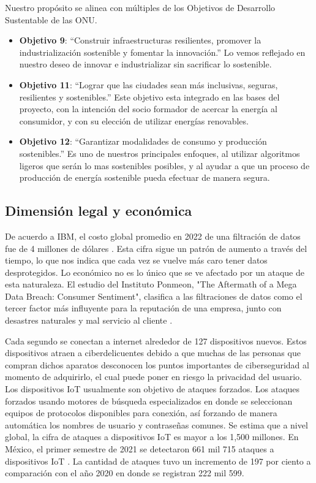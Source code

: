 \documentclass{article}
\begin{document}
            Nuestro propósito se alinea con múltiples de los Objetivos de Desarrollo Sustentable de las ONU.
            \begin{itemize}[noitemsep, leftmargin=*]
                \item \textbf{Objetivo 9}: \enquote{Construir infraestructuras resilientes, promover la industrialización sostenible y fomentar la innovación.}  \cite{obj9} Lo vemos reflejado en nuestro deseo de innovar e industrializar sin sacrificar lo sostenible.
                \item \textbf{Objetivo 11}: \enquote{Lograr que las ciudades sean más inclusivas, seguras, resilientes y sostenibles.} \cite{obj11} Este objetivo esta integrado en las bases del proyecto, con la intención del socio formador de acercar la energía al consumidor, y con su elección de utilizar energías renovables.
                \item \textbf{Objetivo 12}: \enquote{Garantizar modalidades de consumo y producción sostenibles.}\cite{obj12} Es uno de nuestros principales enfoques, al utilizar algoritmos ligeros que serán lo mas sostenibles posibles, y al ayudar a que un proceso de producción de energía sostenible pueda efectuar de manera segura.
            \end{itemize}

        \subsection{Dimensión legal y económica}

            De acuerdo a IBM, el costo global promedio en 2022 de una filtración de datos fue de 4 millones de dólares \cite{cost_DB}. Esta cifra sigue un patrón de aumento a través del tiempo, lo que nos indica que cada vez se vuelve más caro tener datos desprotegidos. Lo económico no es lo único que se ve afectado por un ataque de esta naturaleza. El estudio del Instituto Ponmeon, "The Aftermath of a Mega Data Breach: Consumer Sentiment", clasifica a las filtraciones de datos como el tercer factor más influyente para la reputación de una empresa, junto con desastres naturales y mal servicio al cliente \cite{ponmeon}.

            Cada segundo se conectan a internet alrededor de 127 dispositivos nuevos. Estos dispositivos atraen a ciberdelicuentes debido a que muchas de las personas que compran dichos aparatos desconocen los puntos importantes de ciberseguridad al momento de adquirirlo, el cual puede poner en riesgo la privacidad del usuario. Los dispositivos IoT usualmente son objetivo de ataques forzados. Los ataques forzados usando motores de búsqueda especializados en donde se seleccionan equipos de protocolos disponibles para conexión, así forzando de manera automática los nombres de usuario y contraseñas comunes. Se estima que a nivel global, la cifra de ataques a dispositivos IoT es mayor a los 1,500 millones. En México, el primer semestre de 2021 se detectaron 661 mil 715 ataques a dispositivos IoT \cite{rios_2022}. La cantidad de ataques tuvo un incremento de 197 por ciento a comparación con el año 2020 en donde se registran 222 mil 599.
\end{document}
